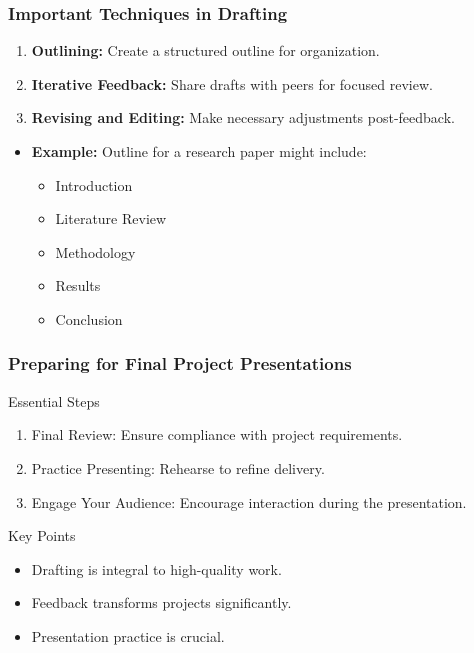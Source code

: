 \documentclass[aspectratio=169]{beamer}
\begin{document}
\begin{frame}[fragile]
    \frametitle{Important Techniques in Drafting}
    \begin{enumerate}
        \item \textbf{Outlining:} Create a structured outline for organization.
        \item \textbf{Iterative Feedback:} Share drafts with peers for focused review.
        \item \textbf{Revising and Editing:} Make necessary adjustments post-feedback.
    \end{enumerate}
    \begin{itemize}
        \item \textbf{Example:} Outline for a research paper might include: 
        \begin{itemize}
            \item Introduction
            \item Literature Review
            \item Methodology
            \item Results
            \item Conclusion
        \end{itemize}
    \end{itemize}
\end{frame}

\begin{frame}[fragile]
    \frametitle{Preparing for Final Project Presentations}
    \begin{block}{Essential Steps}
        \begin{enumerate}
            \item Final Review: Ensure compliance with project requirements.
            \item Practice Presenting: Rehearse to refine delivery.
            \item Engage Your Audience: Encourage interaction during the presentation.
        \end{enumerate}
    \end{block}
    \begin{block}{Key Points}
        \begin{itemize}
            \item Drafting is integral to high-quality work.
            \item Feedback transforms projects significantly.
            \item Presentation practice is crucial.
        \end{itemize}
    \end{block}
\end{frame}
\end{document}
